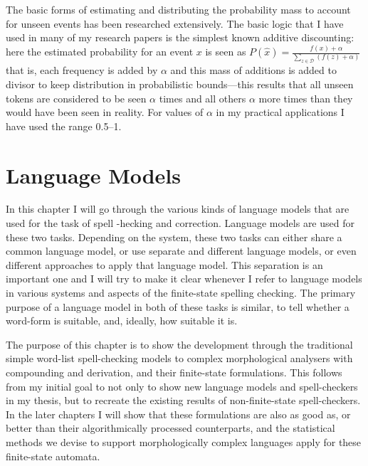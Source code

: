 \documentclass[officiallayout]{unihelcompling}
\begin{document}
The basic forms of estimating and distributing the probability mass to account
for unseen events has been researched extensively. The basic logic that I have
used in many of my research papers is the simplest known additive discounting:
here the estimated probability for an event $x$ is seen as $P(\hat{x}) =
\frac{f(x) + \alpha}{\sum_{z \in \mathcal{D}}(f(z) + \alpha)}$ that is, each
frequency is added by $\alpha$ and this mass of additions is added to divisor
to keep distribution in probabilistic bounds---this results that all unseen
tokens are considered to be seen $\alpha$ times and all others $\alpha$ more
times than they would have been seen in reality. For values of $\alpha$ in
my practical applications I have used the range 0.5--1.



\chapter{Language Models}
\label{chap:language-models}

In this chapter I will go through the various kinds of language models that are
used for the task of spell -hecking and correction. Language models are used
for these two tasks. Depending on the system, these two tasks can either share
a common language model, or use separate and different language models, or even
different approaches to apply that language model. This separation is an
important one and I will try to make it clear whenever I refer to language
models in various systems and aspects of the finite-state spelling checking.
The primary purpose of a language model in both of these tasks is similar, to
tell whether a word-form is suitable, and, ideally, how suitable it is.

The purpose of this chapter is to show the development through the traditional
simple word-list spell-checking models to complex morphological analysers with
compounding and derivation, and their finite-state formulations. This follows
from my initial goal to not only to show new language models and spell-checkers
in my thesis, but to recreate the existing results of non-finite-state
spell-checkers. In the later chapters I will show that these formulations are
also as good as, or better than their algorithmically processed counterparts,
and the statistical methods we devise to support morphologically complex
languages apply for these finite-state automata.
\end{document}

